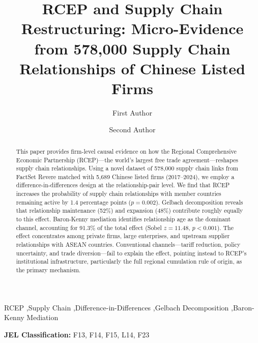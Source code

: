 \documentclass[preprint,12pt,authoryear]{elsarticle}
\begin{document}
\begin{frontmatter}

\title{RCEP and Supply Chain Restructuring: Micro-Evidence from 578,000 Supply Chain Relationships of Chinese Listed Firms}

\author[swufe]{First Author}

\author[swufe]{Second Author}

\address[swufe]{School of Economics, Southwestern University of Finance and Economics, Chengdu, China}


\begin{abstract}
This paper provides firm-level causal evidence on how the Regional Comprehensive Economic Partnership (RCEP)---the world's largest free trade agreement---reshapes supply chain relationships. Using a novel dataset of 578,000 supply chain links from FactSet Revere matched with 5,689 Chinese listed firms (2017--2024), we employ a difference-in-differences design at the relationship-pair level. We find that RCEP increases the probability of supply chain relationships with member countries remaining active by 1.4 percentage points ($p=0.002$). Gelbach decomposition reveals that relationship maintenance (52\%) and expansion (48\%) contribute roughly equally to this effect. Baron-Kenny mediation identifies relationship age as the dominant channel, accounting for 91.3\% of the total effect (Sobel $z=11.48$, $p<0.001$). The effect concentrates among private firms, large enterprises, and upstream supplier relationships with ASEAN countries. Conventional channels---tariff reduction, policy uncertainty, and trade diversion---fail to explain the effect, pointing instead to RCEP's institutional infrastructure, particularly the full regional cumulation rule of origin, as the primary mechanism.
\end{abstract}

\begin{keyword}
RCEP \sep Supply Chain \sep Difference-in-Differences \sep Gelbach Decomposition \sep Baron-Kenny Mediation
\vspace{6pt}

\noindent\textbf{JEL Classification:} F13, F14, F15, L14, F23
\end{keyword}

\end{frontmatter}
\end{document}
